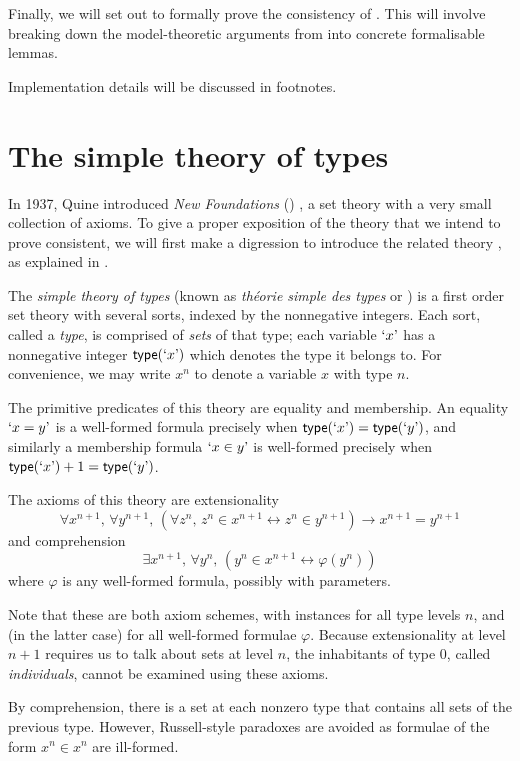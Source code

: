 Finally, we will set out to formally prove the consistency of \NF.
This will involve breaking down the model-theoretic arguments from \cite{typical-ambiguity,holmes-ttt} into concrete formalisable lemmas.

Implementation details will be discussed in footnotes.

\section{The simple theory of types}

In 1937, Quine introduced \emph{New Foundations} (\NF) \cite{quine-nf}, a set theory with a very small collection of axioms.
To give a proper exposition of the theory that we intend to prove consistent, we will first make a digression to introduce the related theory {\TST}, as explained in \cite{con-nf}.

The \emph{simple theory of types} (known as \emph{théorie simple des types} or {\TST}) is a first order set theory with several sorts, indexed by the nonnegative integers.
Each sort, called a \emph{type}, is comprised of \emph{sets} of that type; each variable \( \mquote{x} \) has a nonnegative integer \( \ttype(\mquote x) \) which denotes the type it belongs to.
For convenience, we may write \( x^n \) to denote a variable \( x \) with type \( n \).

The primitive predicates of this theory are equality and membership.
An equality \( \mquote{x = y} \) is a well-formed formula precisely when \( \ttype(\mquote{x}) = \ttype(\mquote{y}) \), and similarly a membership formula \( \mquote{x \in y} \) is well-formed precisely when \( \ttype(\mquote{x}) + 1 = \ttype(\mquote{y}) \).

The axioms of this theory are extensionality
\[ \forall x^{n + 1},\, \forall y^{n + 1},\, (\forall z^n,\, z^n \in x^{n+1} \leftrightarrow z^n \in y^{n+1}) \to x^{n+1} = y^{n+1} \]
and comprehension
\[ \exists x^{n + 1},\, \forall y^n,\, (y^n \in x^{n+1} \leftrightarrow \varphi(y^n)) \]
where \( \varphi \) is any well-formed formula, possibly with parameters.

Note that these are both axiom schemes, with instances for all type levels \( n \), and (in the latter case) for all well-formed formulae \( \varphi \).
Because extensionality at level \( n + 1 \) requires us to talk about sets at level \( n \), the inhabitants of type 0, called \emph{individuals}, cannot be examined using these axioms.

By comprehension, there is a set at each nonzero type that contains all sets of the previous type.
However, Russell-style paradoxes are avoided as formulae of the form \( x^n \in x^n \) are ill-formed.

